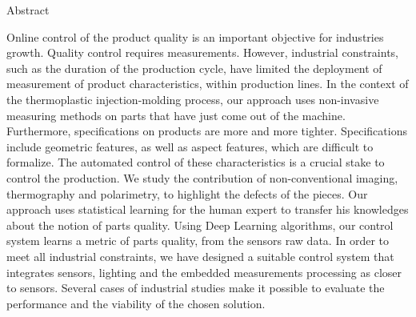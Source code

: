 \vspace*{3cm}
\begin{flushright}
	\fontsize{20pt}{20pt}\selectfont\textnormal{Abstract}
\end{flushright}

Online control of the product quality is an important objective for industries growth.
Quality control requires measurements.
However, industrial constraints, such as the duration of the production cycle, have limited the deployment of measurement of product characteristics, within production lines.
In the context of the thermoplastic injection-molding process, our approach uses non-invasive measuring methods on parts that have just come out of the machine.
Furthermore, specifications on products are more and more tighter.
Specifications include geometric features, as well as aspect features, which are difficult to formalize.
The automated control of these characteristics is a crucial stake to control the production.
We study the contribution of non-conventional imaging, thermography and polarimetry, to highlight the defects of the pieces.
Our approach uses statistical learning for the human expert to transfer his knowledges about the notion of parts quality.
Using Deep Learning algorithms, our control system learns a metric of parts quality, from the sensors raw data.
In order to meet all industrial constraints, we have designed a suitable control system that integrates sensors, lighting and the embedded measurements processing as closer to sensors.
Several cases of industrial studies make it possible to evaluate the performance and the viability of the chosen solution.